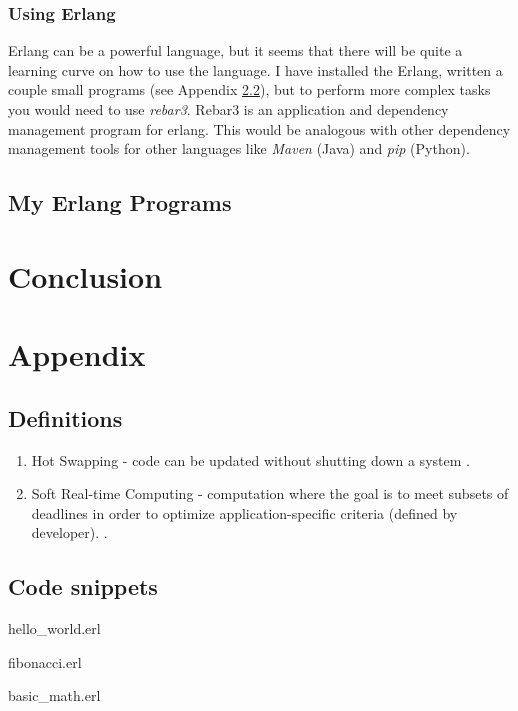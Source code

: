 \documentclass[11 pt]{IEEEtran}
\begin{document}
\subsubsection{Using Erlang}
Erlang can be a powerful language, but it seems that there will be quite a learning curve on how to use the language. I have installed the Erlang, written a couple small programs (see Appendix \ref{code-snippets}), but to perform more complex tasks you would need to use \emph{rebar3}. Rebar3 is an application and dependency management program for erlang. This would be analogous with other dependency management tools for other languages like \emph{Maven} (Java) and \emph{pip} (Python).


\subsection{My Erlang Programs}\label{mytake}
 
\section{Conclusion}


\newpage
\section{Appendix}
\subsection{Definitions}\label{definitions}
\begin{enumerate}
\item  Hot Swapping - code can be updated without shutting down a system \cite{wiki}.
\item Soft Real-time Computing - computation where the goal is to meet subsets of deadlines in order to optimize application-specific criteria (defined by developer). \cite{soft-rt}.
\end{enumerate}
 
\subsection{Code snippets}\label{code-snippets}

    hello\_world.erl
    
    
    fibonacci.erl
    
    
    basic\_math.erl
    
\end{document}
